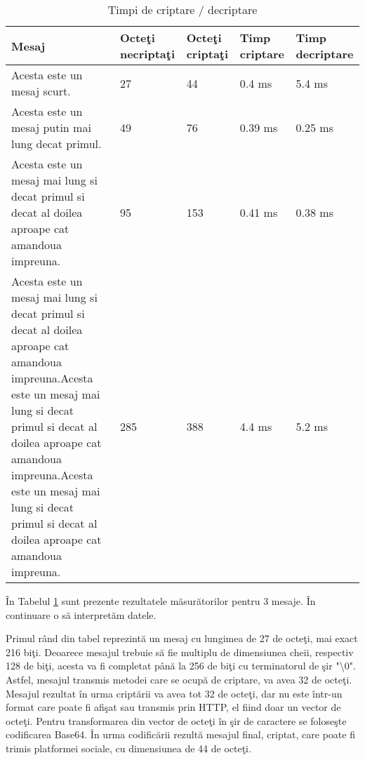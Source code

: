 \begin{center}
\begin{table}[htb]
  \caption{Timpi de criptare / decriptare}
  \begin{tabular}{ | p{4.5cm} | p{2cm} | p{2cm} | p{2cm} | p{2cm} | }
  \hline
Mesaj  & Octe\c{t}i necripta\c{t}i & Octe\c{t}i \newline cripta\c{t}i & Timp \newline criptare & Timp \newline decriptare\\
    \hline
   Acesta este un mesaj scurt. 
 & 27 & 44 & 0.4 ms & 5.4 ms\\
   \hline
   Acesta este un mesaj putin mai lung decat primul. 
 & 49 & 76 & 0.39 ms & 0.25 ms \\
   \hline
   Acesta este un mesaj mai lung si decat primul si decat al doilea aproape cat amandoua impreuna. 
 & 95 & 153 & 0.41 ms & 0.38 ms \\
   \hline
   Acesta este un mesaj mai lung si decat primul si decat al doilea aproape cat amandoua impreuna.Acesta este un mesaj mai lung si decat primul si decat al doilea aproape cat amandoua impreuna.Acesta este un mesaj mai lung si decat primul si decat al doilea aproape cat amandoua impreuna. 
& 285 & 388 & 4.4 ms & 5.2 ms \\
\hline
  \end{tabular}
  \label{table:tabelrezultate}
\end{table}
\end{center}

\^{I}n Tabelul \ref{table:tabelrezultate} sunt prezente rezultatele m\u{a}sur\u{a}torilor pentru 3 mesaje. \^{I}n continuare o s\u{a} interpret\u{a}m datele.

Primul r\^{a}nd din tabel reprezint\u{a} un mesaj cu lungimea de 27 de octe\c{t}i, mai exact 216 bi\c{t}i. Deoarece mesajul trebuie s\u{a} fie multiplu de dimensiunea cheii, respectiv 128 de bi\c{t}i, acesta va fi completat p\^{a}n\u{a} la 256 de bi\c{t}i cu terminatorul de \c{s}ir "\textbackslash{}0". Astfel, mesajul transmis metodei care se ocup\u{a} de criptare, va avea 32 de octe\c{t}i. Mesajul rezultat \^{i}n urma cript\u{a}rii va avea tot 32 de octe\c{t}i, dar nu este \^{i}ntr-un format care poate fi afi\c{s}at sau transmis prin HTTP, el fiind doar un vector de octe\c{t}i. Pentru transformarea din vector de octe\c{t}i \^{i}n \c{s}ir de caractere se folose\c{s}te codificarea Base64. \^{I}n urma codific\u{a}rii rezult\u{a} mesajul final, criptat, care poate fi trimis platformei sociale, cu dimensiunea de 44 de octe\c{t}i.

